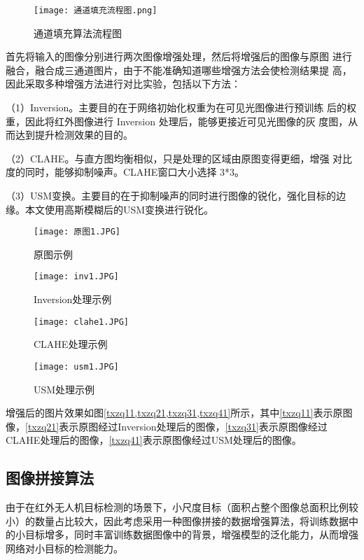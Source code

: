 \begin{figure}[h]
  \centering
  \texttt{[image: 通道填充流程图.png]}
  \caption{通道填充算法流程图}
  \label{tdtc}
\end{figure}

首先将输入的图像分别进行两次图像增强处理，然后将增强后的图像与原图
进行融合，融合成三通道图片，由于不能准确知道哪些增强方法会使检测结果提
高，因此采取多种增强方法进行对比实验，包括以下方法：

（1）Inversion。主要目的在于网络初始化权重为在可见光图像进行预训练
后的权重，因此将红外图像进行 Inversion 处理后，能够更接近可见光图像的灰
度图，从而达到提升检测效果的目的。

（2）CLAHE。与直方图均衡相似，只是处理的区域由原图变得更细，增强
对比度的同时，能够抑制噪声。CLAHE窗口大小选择 3*3。

（3）USM变换。主要目的在于抑制噪声的同时进行图像的锐化，强化目标的边缘。本文使用高斯模糊后的USM变换进行锐化。

\begin{figure}[htbp]
	\centering
	\begin{minipage}{0.49\linewidth}
		\centering
		\texttt{[image: 原图1.JPG]}
		\caption{原图示例}
		\label{txzq11}%
	\end{minipage}
	\begin{minipage}{0.49\linewidth}
		\centering
		\texttt{[image: inv1.JPG]}
		\caption{Inversion处理示例}
		\label{txzq21}%
	\end{minipage}
	
	\begin{minipage}{0.49\linewidth}
		\centering
		\texttt{[image: clahe1.JPG]}
		\caption{CLAHE处理示例}
		\label{txzq31}%
	\end{minipage}
	\begin{minipage}{0.49\linewidth}
		\centering
		\texttt{[image: usm1.JPG]}
		\caption{USM处理示例}
		\label{txzq41}%
	\end{minipage}
  \label{txzq}
\end{figure}

增强后的图片效果如图\ref{txzq11,txzq21,txzq31,txzq41}所示，其中\ref{txzq11}表示原图像，\ref{txzq21}表示原图经过Inversion处理后的图像，\ref{txzq31}表示原图像经过CLAHE处理后的图像，\ref{txzq41}表示原图像经过USM处理后的图像。

\subsection{图像拼接算法}
由于在红外无人机目标检测的场景下，小尺度目标（面积占整个图像总面积比例较小）的数量占比较大，因此考虑采用一种图像拼接的数据增强算法，将训练数据中的小目标增多，同时丰富训练数据图像中的背景，增强模型的泛化能力，从而增强网络对小目标的检测能力。

